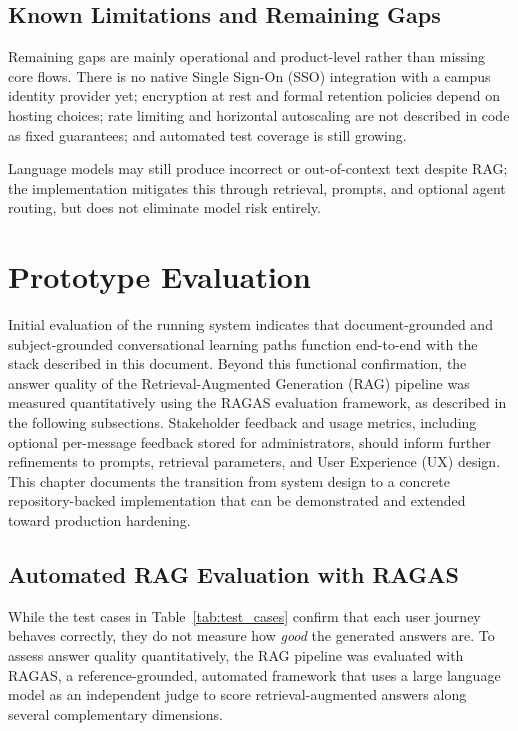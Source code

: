 \documentclass[12pt, a4paper, oneside]{report}
\let\oldsection\section
\renewcommand{\section}{%
  \addtocontents{toc}{\protect\needspace{4\baselineskip}}%
  \oldsection
}
\let\oldsubsection\subsection
\renewcommand{\subsection}{%
  \addtocontents{toc}{\protect\needspace{3\baselineskip}}%
  \oldsubsection
}
\begin{document}
\subsection{Known Limitations and Remaining Gaps}

Remaining gaps are mainly operational and product-level rather than missing core flows. There is no native Single Sign-On (SSO) integration with a campus identity provider yet; encryption at rest and formal retention policies depend on hosting choices; rate limiting and horizontal autoscaling are not described in code as fixed guarantees; and automated test coverage is still growing.

Language models may still produce incorrect or out-of-context text despite RAG; the implementation mitigates this through retrieval, prompts, and optional agent routing, but does not eliminate model risk entirely.
\section{Prototype Evaluation}

Initial evaluation of the running system indicates that document-grounded and subject-grounded conversational learning paths function end-to-end with the stack described in this document. Beyond this functional confirmation, the answer quality of the Retrieval-Augmented Generation (RAG) pipeline was measured quantitatively using the RAGAS evaluation framework, as described in the following subsections. Stakeholder feedback and usage metrics, including optional per-message feedback stored for administrators, should inform further refinements to prompts, retrieval parameters, and User Experience (UX) design. This chapter documents the transition from system design to a concrete repository-backed implementation that can be demonstrated and extended toward production hardening.
\newpage
\subsection{Automated RAG Evaluation with RAGAS}

While the test cases in Table~\ref{tab:test_cases} confirm that each user journey behaves correctly, they do not measure how \emph{good} the generated answers are. To assess answer quality quantitatively, the RAG pipeline was evaluated with RAGAS, a reference-grounded, automated framework that uses a large language model as an independent judge to score retrieval-augmented answers along several complementary dimensions.
\end{document}
